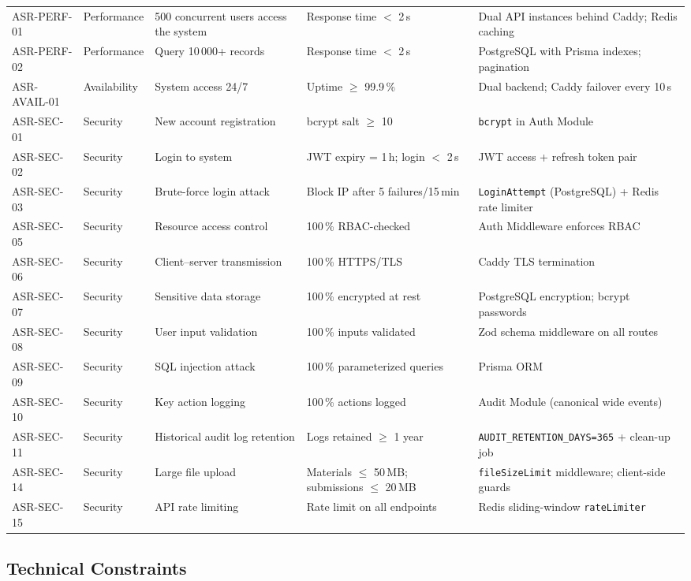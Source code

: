 \documentclass[12pt,a4paper]{article}
\begin{document}
\begin{longtable}{L{2.1cm} L{1.8cm} L{3.5cm} L{2.5cm} L{4cm}}
  ASR-PERF-01 & Performance & 500 concurrent users access the system & Response time $<$ 2\,s & Dual API instances behind Caddy; Redis caching \\
  ASR-PERF-02 & Performance & Query 10\,000+ records & Response time $<$ 2\,s & PostgreSQL with Prisma indexes; pagination \\
  ASR-AVAIL-01 & Availability & System access 24/7 & Uptime $\geq$ 99.9\,\% & Dual backend; Caddy failover every 10\,s \\
  ASR-SEC-01 & Security & New account registration & bcrypt salt $\geq$ 10 & \texttt{bcrypt} in Auth Module \\
  ASR-SEC-02 & Security & Login to system & JWT expiry = 1\,h; login $<$ 2\,s & JWT access + refresh token pair \\
  ASR-SEC-03 & Security & Brute-force login attack & Block IP after 5 failures/15\,min & \texttt{LoginAttempt} (PostgreSQL) + Redis rate limiter \\
  ASR-SEC-05 & Security & Resource access control & 100\,\% RBAC-checked & Auth Middleware enforces RBAC \\
  ASR-SEC-06 & Security & Client--server transmission & 100\,\% HTTPS/TLS & Caddy TLS termination \\
  ASR-SEC-07 & Security & Sensitive data storage & 100\,\% encrypted at rest & PostgreSQL encryption; bcrypt passwords \\
  ASR-SEC-08 & Security & User input validation & 100\,\% inputs validated & Zod schema middleware on all routes \\
  ASR-SEC-09 & Security & SQL injection attack & 100\,\% parameterized queries & Prisma ORM \\
  ASR-SEC-10 & Security & Key action logging & 100\,\% actions logged & Audit Module (canonical wide events) \\
  ASR-SEC-11 & Security & Historical audit log retention & Logs retained $\geq$ 1 year & \texttt{AUDIT\_RETENTION\_DAYS=365} + clean-up job \\
  ASR-SEC-14 & Security & Large file upload & Materials $\leq$ 50\,MB; submissions $\leq$ 20\,MB & \texttt{fileSizeLimit} middleware; client-side guards \\
  ASR-SEC-15 & Security & API rate limiting & Rate limit on all endpoints & Redis sliding-window \texttt{rateLimiter} \\
\end{longtable}
\endgroup

\subsection{Technical Constraints}
\end{document}
